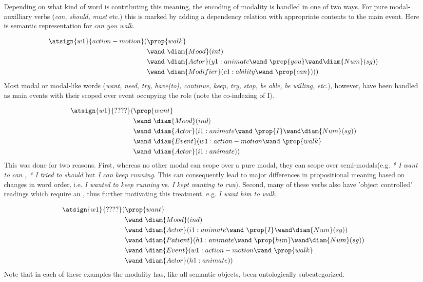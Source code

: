 
Depending on what kind of word is contributing this meaning, the encoding of modality is handled in one of two ways.  For pure modal-auxilliary verbs (\emph{can, should, must} etc.) this is marked by adding a  dependency relation with appropriate contents to the main event. Here is semantic representation for \emph{can you walk}. 

\vspace{-1.5em} 
\begin{align*}
\atsign{w1}{action-motion}(& \prop{walk}  \\ 
      & \wand\ \diam{Mood}(int) \\
      & \wand\ \diam{Actor}(y1:animate \wand\ \prop{you}\wand \diam{Num}(sg))  \\ 
      & \wand\ \diam{Modifier}(c1:ability \wand\ \prop{can}) ))
\end{align*} 
Most modal or modal-like words (\emph{want, need, try, have(to), continue, keep, try, stop, be able, be willing, etc.}), however, have been handled as main events with their scoped over event occupying the role  (note the co-indexing of I).

\vspace{-1.5em} 
\begin{align*}
\atsign{w1}{????}(& \prop{want}  \\ 
      & \wand\ \diam{Mood}(ind) \\
      & \wand\ \diam{Actor}(i1:animate \wand\ \prop{I}\wand \diam{Num}(sg))  \\ 
      & \wand\ \diam{Event}(w1:action-motion \wand\ \prop{walk} \\
      & \wand\ \diam{Actor}(i1:animate)) 
\end{align*} 
This was done for two reasons. First, whereas no other modal can scope over a pure modal, they can scope over semi-modals(e.g. \emph{* I want to can , * I tried to should } but \emph{I can keep running}. This can consequently lead to major differences in propositional meaning based on changes in word order, i.e. \emph{I wanted to keep running} vs. \emph{I kept wanting to run}). Second, many of these verbs also have 'object controlled' readings which require an , thus further motivating this treatment. e.g. \emph{I want him to walk}.
\vspace{-1.5em} 

\begin{align*}
\atsign{w1}{????}(& \prop{want}  \\ 
      & \wand\ \diam{Mood}(ind) \\
      & \wand\ \diam{Actor}(i1:animate \wand\ \prop{I}\wand \diam{Num}(sg))  \\ 
      & \wand\ \diam{Patient}(h1:animate \wand\ \prop{him}\wand \diam{Num}(sg))  \\ 
      & \wand\ \diam{Event}(w1:action-motion \wand\ \prop{walk} \\
      & \wand\ \diam{Actor}(h1:animate))
\end{align*} 
Note that in each of these examples the modality has, like all semantic objects, been ontologically subcategorized. 


